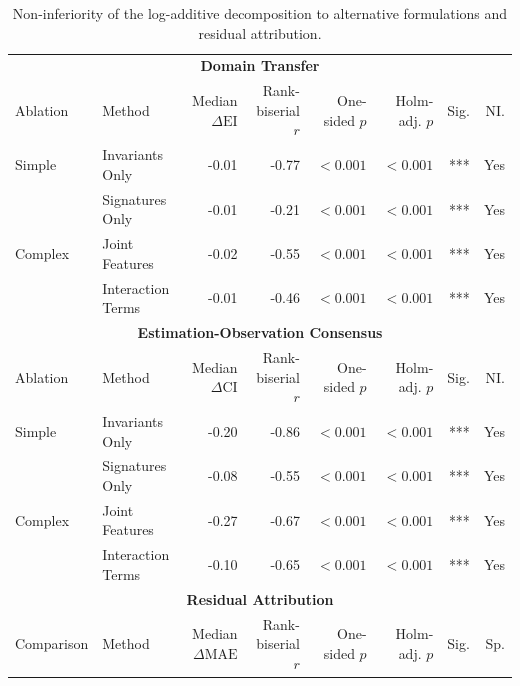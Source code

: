 \documentclass{article}
\begin{document}
\clearpage
\begin{table}[H]
\centering
\footnotesize
\captionsetup{position=top,skip=12pt}
\caption{Non-inferiority of the log-additive decomposition to alternative formulations and residual attribution.}
\label{tab:si-ablation}
\setlength{\tabcolsep}{2pt}
\begin{tabularx}{\linewidth}{@{}l>{\raggedright\arraybackslash}Xrrrrrr@{}}
\toprule
\multicolumn{8}{c}{\textbf{Domain Transfer}} \\
\cmidrule(lr){1-8}
Ablation & Method & \shortstack{Median\\$\Delta\mathrm{EI}$} & \shortstack{Rank-biserial\\$r$} & \shortstack{One-sided\\$p$} & \shortstack{Holm-adj.\\$p$} & Sig. & NI. \\
\midrule
Simple & Invariants Only & -0.01 & -0.77 & $<0.001$ & $<0.001$ & *** & Yes \\
 & Signatures Only & -0.01 & -0.21 & $<0.001$ & $<0.001$ & *** & Yes \\
\addlinespace
Complex & Joint Features & -0.02 & -0.55 & $<0.001$ & $<0.001$ & *** & Yes \\
 & Interaction Terms & -0.01 & -0.46 & $<0.001$ & $<0.001$ & *** & Yes \\
\midrule
\multicolumn{8}{c}{\textbf{Estimation-Observation Consensus}} \\
\cmidrule(lr){1-8}
Ablation & Method & \shortstack{Median\\$\Delta\mathrm{CI}$} & \shortstack{Rank-biserial\\$r$} & \shortstack{One-sided\\$p$} & \shortstack{Holm-adj.\\$p$} & Sig. & NI. \\
\midrule
Simple & Invariants Only & -0.20 & -0.86 & $<0.001$ & $<0.001$ & *** & Yes \\
 & Signatures Only & -0.08 & -0.55 & $<0.001$ & $<0.001$ & *** & Yes \\
\addlinespace
Complex & Joint Features & -0.27 & -0.67 & $<0.001$ & $<0.001$ & *** & Yes \\
 & Interaction Terms & -0.10 & -0.65 & $<0.001$ & $<0.001$ & *** & Yes \\
\midrule
\multicolumn{8}{c}{\textbf{Residual Attribution}} \\
\cmidrule(lr){1-8}
Comparison & Method & \shortstack{Median\\$\Delta\mathrm{MAE}$} & \shortstack{Rank-biserial\\$r$} & \shortstack{One-sided\\$p$} & \shortstack{Holm-adj.\\$p$} & Sig. & Sp. \\

\end{tabularx}
\end{table}
\end{document}
